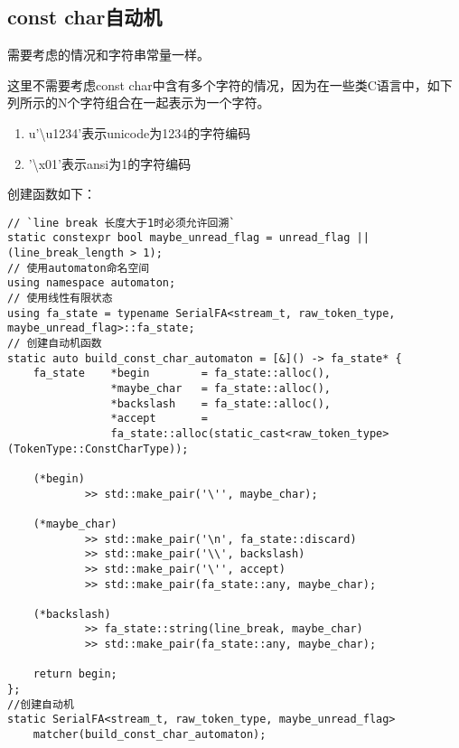 \documentclass[UTF8]{ctexart}
\newcommand{\fira}[1]{{\firacode {}#1}}
\begin{document}
\subsection{const char自动机}
\begin{figure}[!h]
    \centering
\end{figure}
\par 需要考虑的情况和字符串常量一样。
\par 这里不需要考虑const char中含有多个字符的情况，因为在一些类C语言中，如下列所示的N个字符组合在一起表示为一个字符。
\begin{enumerate}[]
    \item u'\textbackslash u1234'表示unicode为1234的字符编码
    \item '\textbackslash x01'表示ansi为1的字符编码
\end{enumerate}
\par 创建函数如下：
{\firacode
\begin{lstlisting}[language={[ANSI]C++}]
// `line break 长度大于1时必须允许回溯`
static constexpr bool maybe_unread_flag = unread_flag || (line_break_length > 1);
// 使用automaton命名空间
using namespace automaton;
// 使用线性有限状态
using fa_state = typename SerialFA<stream_t, raw_token_type, maybe_unread_flag>::fa_state;
// 创建自动机函数
static auto build_const_char_automaton = [&]() -> fa_state* {
    fa_state    *begin        = fa_state::alloc(),
                *maybe_char   = fa_state::alloc(),
                *backslash    = fa_state::alloc(),
                *accept       =
                fa_state::alloc(static_cast<raw_token_type>(TokenType::ConstCharType));
    
    (*begin)
            >> std::make_pair('\'', maybe_char);
    
    (*maybe_char)
            >> std::make_pair('\n', fa_state::discard)
            >> std::make_pair('\\', backslash)
            >> std::make_pair('\'', accept)
            >> std::make_pair(fa_state::any, maybe_char);
            
    (*backslash)
            >> fa_state::string(line_break, maybe_char)
            >> std::make_pair(fa_state::any, maybe_char);

    return begin;
};
//创建自动机
static SerialFA<stream_t, raw_token_type, maybe_unread_flag> 
    matcher(build_const_char_automaton);
\end{lstlisting}
}
\end{document}
